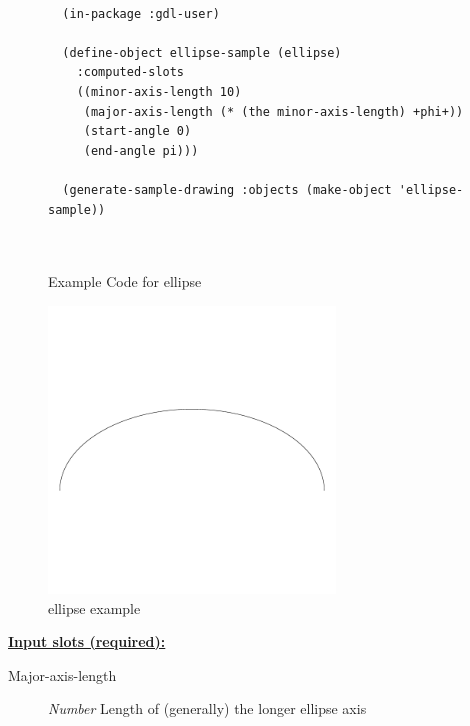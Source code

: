 \documentclass [11pt]{book}
\begin{document}
\begin{itemize}
\begin{figure}
\begin{lrbox}{\boxedverb}
\begin{minipage}{\linewidth}
{\begin{verbatim}
  
  (in-package :gdl-user)

  (define-object ellipse-sample (ellipse)
    :computed-slots
    ((minor-axis-length 10)
     (major-axis-length (* (the minor-axis-length) +phi+))
     (start-angle 0)
     (end-angle pi)))

  (generate-sample-drawing :objects (make-object 'ellipse-sample))
  
  
\end{verbatim}}
\end{minipage}
\end{lrbox}
\fbox{\usebox{\boxedverb}}

\caption{Example Code for ellipse}

\label{fig:example-code-ellipse}

\end{figure}

\begin{figure}
\begin{center}
\includegraphics[width=3in,height=3in]{../images/example-ellipse.pdf}
\end{center}

\caption{ellipse example}

\label{fig:ellipse}

\end{figure}





\textbf{
\underline{Input slots (required):}}

\begin{description}

\item [Major-axis-length]
\emph{Number} Length of (generally) the longer ellipse axis



\end{description}
\end{itemize}
\end{document}
